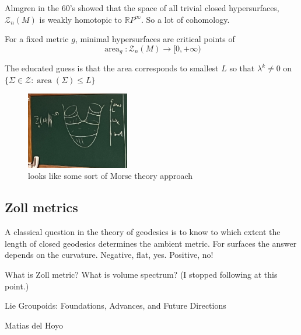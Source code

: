 Almgren in the 60's showed that the space of all trivial closed hypersurfaces,
\(\mathcal{Z}_n(M)\) is weakly homotopic to \(\mathbb{R}P^{\infty}\). So a lot of cohomology.

For a fixed metric \(g\), minimal hypersurfaces are critical points of
\[\operatorname{area}_g: \mathcal{Z}_n(M) \to [0,+\infty)\]

The educated guess is that the area corresponds to
smallest \(L\) so that \(\lambda^k \neq 0 \) on \(\{ \Sigma\in \mathcal{Z}:\operatorname{area}(\Sigma)\leq L\}\)

\begin{figure}[H]
	\centering
	\includegraphics[width=0.4\textwidth]{systolic}
	\caption*{looks like some sort of Morse theory approach}
\end{figure}

\subsection{Zoll metrics}
A classical question in the theory of geodesics is to know to which extent the length of closed geodesics determines the ambient metric. For surfaces the answer depends on the curvature. Negative, flat, yes. Positive, no!

\begin{question}[dani]\leavevmode
What is Zoll metric? What is volume spectrum? (I stopped following at this point.)
\end{question}

\clearpage{}
{\Huge Lie Groupoids: Foundations, Advances, and Future Directions}

\hfill{\Large Matias del Hoyo}


